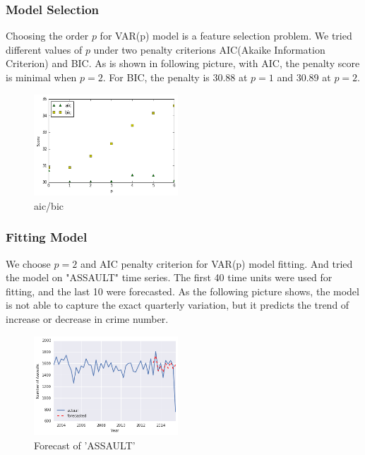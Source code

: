 \documentclass[11pt,conference]{IEEEtran}
\begin{document}
\subsubsection{Model Selection}
Choosing the order $p$ for VAR(p) model is a feature selection problem. We tried different values of $p$ under two penalty criterions AIC(Akaike Information Criterion) and BIC. As is shown in following picture, with AIC, the penalty score is minimal when $p=2$. For BIC, the penalty is 30.88 at $p=1$ and 30.89 at $p=2$.
\begin{figure}[H]
\begin{center}
\includegraphics [width=0.48\textwidth]{pics/aic_bic.png}
\caption{aic/bic}
\end{center}
\end{figure}

\subsubsection{Fitting Model}
We choose $p=2$ and AIC penalty criterion for VAR(p) model fitting. And tried the model on "ASSAULT" time series. The first 40 time units were used for fitting, and the last 10 were forecasted. As the following picture shows, the model is not able to capture the exact quarterly variation, but it predicts the trend of increase or decrease in crime number.
\begin{figure}%
\begin{center}
\includegraphics [width=0.48\textwidth]{pics/assault_forecast.png}
\caption{Forecast of 'ASSAULT'}
\end{center}
\end{figure}
\end{document}
